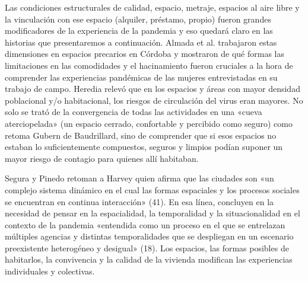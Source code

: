 \begin{refsection}
Las condiciones estructurales de calidad, espacio, metraje, espacios al aire libre y la vinculación con ese espacio (alquiler, préstamo, propio) fueron grandes modificadores de la experiencia de la pandemia y eso quedará claro en las historias que presentaremos a continuación. Almada et al. \protect\parencite*{4261-ALMADA2023} trabajaron estas dimensiones en espacios precarios en Córdoba y mostraron de qué formas las limitaciones en las comodidades y el hacinamiento fueron cruciales a la hora de comprender las experiencias pandémicas de las mujeres entrevistadas en su trabajo de campo. Heredia \protect\parencite*{4182-HEREDIA2022} relevó que en los espacios y áreas con mayor densidad poblacional y/o habitacional, los riesgos de circulación del virus eran mayores. No solo se trató de la convergencia de todas las actividades en una «cueva aterciopelada» (un espacio cerrado, confortable y percibido como seguro) como retoma Gubern \protect\parencite*{4184-GUBERN1987} de Baudrillard, sino de comprender que si esos espacios no estaban lo suficientemente compuestos, seguros y limpios podían suponer un mayor riesgo de contagio para quienes allí habitaban.

Segura y Pinedo \protect\parencite*{4256-SEGURA2022} retoman a Harvey \protect\parencite*{4225-HARVEY1977} quien afirma que las ciudades son «un complejo sistema dinámico en el cual las formas espaciales y los procesos sociales se encuentran en continua interacción» (41). En esa línea, concluyen en la necesidad de pensar en la espacialidad, la temporalidad y la situacionalidad en el contexto de la pandemia «entendida como un proceso en el que se entrelazan múltiples agencias y distintas temporalidades que se despliegan en un escenario preexistente heterogéneo y desigual» (18). Los espacios, las formas posibles de habitarlos, la convivencia y la calidad de la vivienda modifican las experiencias individuales y colectivas.


\end{refsection}
